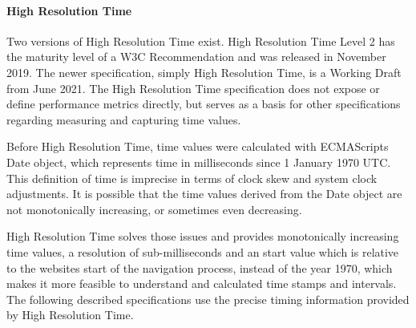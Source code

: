 \paragraph{High Resolution Time}

Two versions of High Resolution Time exist.
High Resolution Time Level 2 has the maturity level of a W3C Recommendation and was released in November 2019. %
The newer specification, simply High Resolution Time,  is a Working Draft from June 2021.%
The High Resolution Time specification does not expose or define performance metrics directly, but serves as a basis for other specifications regarding measuring and capturing time values.



Before High Resolution Time, time values were calculated with ECMAScripts Date object, which represents time in milliseconds since 1 January 1970 UTC. %
This definition of time is imprecise in terms of clock skew and system clock adjustments.
It is possible that the time values derived from the Date object are not monotonically increasing, or sometimes even decreasing.

High Resolution Time solves those issues and provides monotonically increasing time values, a resolution of sub-milliseconds and an start value which is relative to the websites start of the navigation process, instead of the year 1970, which makes it more feasible to understand and calculated time stamps and intervals.
The following described specifications use the precise timing information provided by High Resolution Time.







	
